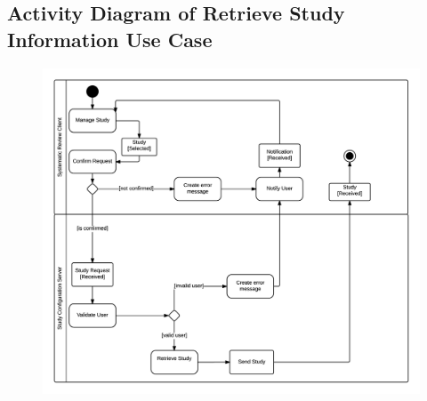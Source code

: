\subsection{ Activity Diagram of Retrieve Study Information Use Case}
\begin{figure}[H]
  \includegraphics[width=45em]{section/DynamicModel/Activity_Diagram_RetrieveStudyInformation}
  \label{fig: Activity Diagram of Retrieve Study Information Use Case}
\end{figure}

